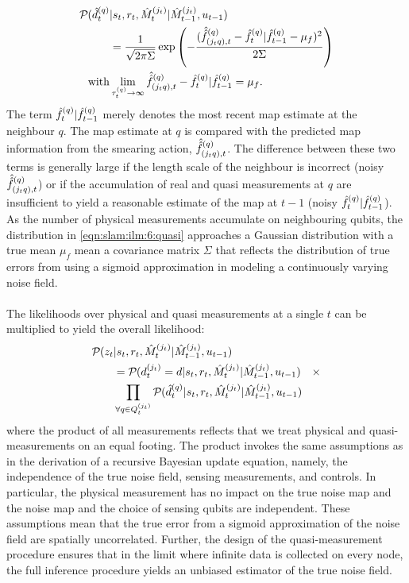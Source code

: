 \begin{align}
\mathcal{P}_{} (  \hat{d}^{( q )}_{t}&|s_{ t}, r_{ t}, \hat{M}_t^{(j_t)}| \hat{M}_{t-1}^{(j_t)}, u_{t-1 } ) \nonumber \\
& = \frac{1}{\sqrt{2\pi \Sigma}} \exp \left( -\frac{( \hat{\hat{f}}^{(q)}_{(j_tq),t} - \hat{f}^{( q )}_{t}|\hat{f}^{( q )}_{t-1} - \mu_f )^2}{2 \Sigma }\right) \label{eqn:slam:ilm:6:quasi}  \\
\mathrm{with } & \lim_{\tau_t^{(q)} \to \infty} \hat{\hat{f}}^{(q)}_{(j_tq),t} - \hat{f}^{( q )}_{t}|\hat{f}^{( q )}_{t-1}   = \mu_f. \label{eqn:slam:ilm:7}
\end{align} The term $\hat{f}^{( q )}_{t}|\hat{f}^{( q )}_{t-1} $ merely denotes the most recent map estimate at the neighbour $q$. The map estimate at $q$ is compared with the predicted map information from the smearing action, $\hat{\hat{f}}^{(q)}_{(j_tq),t}$. The difference between these two terms is generally large if the length scale of the neighbour is incorrect  (noisy $ \hat{\hat{f}}^{(q)}_{(j_tq),t}$) or if the accumulation of real and quasi measurements at $q$ are insufficient to yield a reasonable estimate of the map at $t-1$  (noisy $ \hat{f}^{( q )}_{t}|\hat{f}^{( q )}_{t-1} $).  As the number of physical measurements accumulate on neighbouring qubits, the distribution in \cref{eqn:slam:ilm:6:quasi} approaches a Gaussian  distribution with a true mean $\mu_f$ mean a covariance matrix $\Sigma$ that reflects the distribution of true errors from using a sigmoid approximation in modeling a continuously varying noise field.\\
\\ The likelihoods over physical and quasi measurements at a single $t$ can be multiplied to yield the overall likelihood:
\begin{align}
	\mathcal{P}_{} (  z_t& | s_{ t}, r_{ t}, \hat{M}_t^{(j_t)}| \hat{M}_{t-1}^{(j_t)}, u_{t-1 }  ) \nonumber \\
	&= \mathcal{P}_{} ( d^{( j_t )}_{t}=d | s_{ t}, r_{ t}, \hat{M}_t^{(j_t)}| \hat{M}_{t-1}^{(j_t)}, u_{t-1} ) \quad  \times \nonumber \\
	& \prod_{\forall q \in Q^{( j_t )}_{t}} \mathcal{P}_{} (  \hat{d}^{( q )}_{t}|s_{ t}, r_{ t}, \hat{M}_t^{(j_t)}| \hat{M}_{t-1}^{(j_t)}, u_{t-1 } ) \label{eqn:slam:ilm:8}
\end{align} where the product of all measurements reflects that we treat physical and quasi-measurements on  an equal footing. The product invokes the same assumptions as in the derivation of a recursive Bayesian update equation, namely, the independence of the true noise field, sensing measurements, and controls. In particular, the physical measurement has no impact on the true noise map and the noise map and the choice of sensing qubits are independent. These assumptions mean that the true error from a sigmoid approximation of the noise field are spatially uncorrelated. Further, the design of the quasi-measurement procedure ensures that in the limit where infinite data is collected on every node, the full inference procedure yields an unbiased estimator of the true noise field. \\
